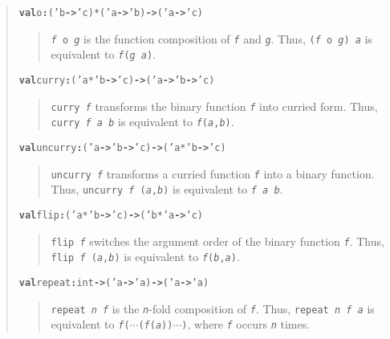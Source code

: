 \documentclass[twoside,titlepage]{article}
\begin{document}
\begin{appendix}
{\begin{quote}
\begin{alltt}
\textbf{val} o \textbf{:} ('b \textbf{->} 'c) * ('a \textbf{->} 'b) \textbf{->} ('a \textbf{->} 'c)
\end{alltt}
  \begin{quote}
  {\tt\textsl{f} o \textsl{g}} is the function composition of {\tt\textsl{f}} and {\tt\textsl{g}}. Thus, {\tt(\textsl{f} o \textsl{g}) \textsl{a}} is equivalent to {\tt\textsl{f}(\textsl{g a})}.
  \end{quote}

\begin{alltt}
\textbf{val} curry \textbf{:} ('a * 'b \textbf{->} 'c) \textbf{->} ('a \textbf{->} 'b \textbf{->} 'c)
\end{alltt}
  \begin{quote}
  {\tt curry \textsl{f}} transforms the binary function {\tt\textsl{f}} into curried form. Thus, {\tt curry \textsl{f a b}} is equivalent to {\tt \textsl{f}(\textsl{a},\textsl{b})}.
  \end{quote}

\begin{alltt}
\textbf{val} uncurry \textbf{:} ('a \textbf{->} 'b \textbf{->} 'c) \textbf{->} ('a * 'b \textbf{->} 'c)
\end{alltt}
  \begin{quote}
  {\tt uncurry \textsl{f}} transforms a curried function {\tt\textsl{f}} into a binary function. Thus, {\tt uncurry \textsl{f} (\textsl{a},\textsl{b})} is equivalent to {\tt\textsl{f a b}}.
  \end{quote}

\begin{alltt}
\textbf{val} flip \textbf{:} ('a * 'b \textbf{->} 'c) \textbf{->} ('b * 'a \textbf{->} 'c)
\end{alltt}
  \begin{quote}
  {\tt flip \textsl{f}} switches the argument order of the binary function {\tt\textsl{f}}. Thus, {\tt flip \textsl{f} (\textsl{a},\textsl{b})} is equivalent to {\tt\textsl{f}(\textsl{b},\textsl{a})}.
  \end{quote}

\begin{alltt}
\textbf{val} repeat \textbf{:} int \textbf{->} ('a \textbf{->} 'a) \textbf{->} ('a \textbf{->} 'a)
\end{alltt}
  \begin{quote}
  {\tt repeat \textsl{n f}} is the {\tt\textsl{n}}-fold composition of {\tt\textsl{f}}. Thus, {\tt repeat \textsl{n f a}} is equivalent to {\tt \textsl{f}($\cdots$(\textsl{f}(\textsl{a}))$\cdots$)}, where {\tt\textsl{f}} occurs {\tt\textsl{n}} times.
  \end{quote}


\end{quote}}
\end{appendix}
\end{document}
